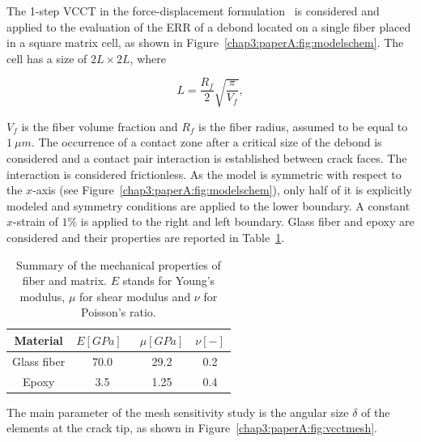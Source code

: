 The 1-step VCCT in the force-displacement formulation~\cite{Krueger2004} is considered and applied to the evaluation of the ERR of a debond located on a single fiber placed in a square matrix cell, as shown in Figure~\ref{chap3:paperA:fig:modelschem}. The cell has a size of $2L\times2L$, where

\begin{equation}\label{chap3:paperA:eq:LVf}
L=\frac{R_{f}}{2}\sqrt{\frac{\pi}{V_{f}}},
\end{equation}

$V_{f}$ is the fiber volume fraction and $R_{f}$ is the fiber radius, assumed to be equal to $1\ \mu m$. The occurrence of a contact zone after a critical size of the debond is considered and a contact pair interaction is established between crack faces. The interaction is considered frictionless. As the model is symmetric with respect to the $x$-axis (see Figure~\ref{chap3:paperA:fig:modelschem}), only half of it is explicitly modeled and symmetry conditions are applied to the lower boundary. A constant $x$-strain of $1\%$ is applied to the right and left boundary. Glass fiber and epoxy are considered and their properties are reported in Table~\ref{chap3:paperA:tab:phaseprop}.

\begin{table}[!htbp]
 \centering
 \caption{Summary of the mechanical properties of fiber and matrix. $E$ stands for Young's modulus, $\mu$ for shear modulus and $\nu$ for Poisson's ratio.}
 \begin{tabular}{cccc}
\\
\textbf{Material} & \textbf{$E\left[GPa\right]$}\ & \textbf{$\mu\left[GPa\right]$} & \textbf{$\nu\left[-\right]$} \\
\midrule
Glass fiber    & 70.0  & 29.2   & 0.2  \\
Epoxy    & 3.5    & 1.25   & 0.4
\end{tabular}
\label{chap3:paperA:tab:phaseprop}
\end{table}

The main parameter of the mesh sensitivity study is the angular size $\delta$ of the elements at the crack tip, as shown in Figure~\ref{chap3:paperA:fig:vcctmesh}.

